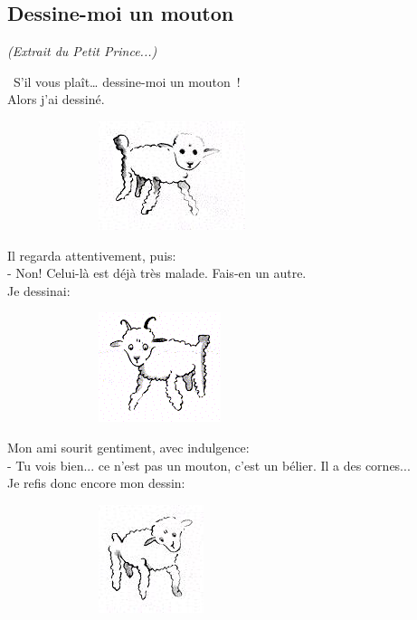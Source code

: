 \documentclass[12pt]{article}
\begin{document}
\subsection*{Dessine-moi un mouton}

\textit{(Extrait du Petit Prince...)}

\begin{multicols}{2}
  \og S'il vous plaît… dessine-moi un mouton ! \fg \\
  Alors j'ai dessiné.
  
  \begin{figure}[H]
        \centering
        \includegraphics[width=0.3\linewidth]{3x2-calcul-litteral-1/sources/dm-mouton2.png}
  \end{figure}

  Il regarda attentivement, puis: \\
  - Non! Celui-là est déjà très malade. Fais-en un autre. \\
  Je dessinai:

  \begin{figure}[H]
        \centering
        \includegraphics[width=0.3\linewidth]{3x2-calcul-litteral-1/sources/dm-mouton1.png}
  \end{figure}

  Mon ami sourit gentiment, avec indulgence: \\
  - Tu vois bien... ce n'est pas un mouton, c'est un bélier. Il a des cornes... \\
  Je refis donc encore mon dessin:

  \begin{figure}[H]
        \centering
        \includegraphics[width=0.3\linewidth]{3x2-calcul-litteral-1/sources/dm-mouton3.png}
  \end{figure}
  

\end{multicols}
\end{document}
